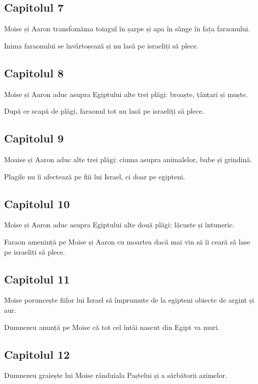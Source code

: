 \documentclass[12pt,a4paper]{article}
\begin{document}
\subsection{Capitolul 7}

Moise și Aaron transfomăma toiagul în șarpe și apa în sânge în fața faraonului.

Inima faraonului se învârtoșează și nu lasă pe israeliți să plece.

\subsection{Capitolul 8}

Moise și Aaron aduc asupra Egiptului alte trei plăgi: broaște, țânțari și muște.

După ce scapă de plăgi, faraonul tot nu lasă pe israeliți să plece.

\subsection{Capitolul 9}

Moaise și Aaron aduc alte trei plăgi: ciuma asupra animalelor, bube și grindină.

Plagile nu îi afectează pe fiii lui Israel, ci doar pe egipteni.

\subsection{Capitolul 10}

Moise și Aaron aduc asupra Egiptului alte două plăgi: lăcuste și întuneric.

Faraon amenință pe Moise și Aaron cu moartea dacă mai vin să îi ceară să lase pe israeliți să plece.

\subsection{Capitolul 11}

Moise poruncește fiilor lui Israel să împrumute de la egipteni obiecte de argint și aur.

Dumnezeu anunță pe Moise că tot cel întâi nascut din Egipt va muri.

\subsection{Capitolul 12}

Dumnezeu graiește lui Moise rânduiala Paștelui și a sărbătorii azimelor.
\end{document}
